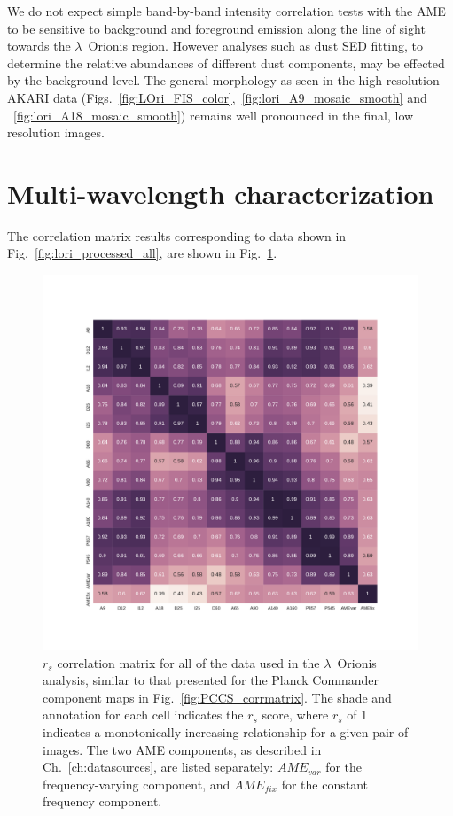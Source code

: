           We do not expect simple band-by-band intensity correlation tests with the AME to be sensitive to background and foreground emission along the line of sight towards the $\lambda$~Orionis region. However analyses such as dust SED fitting, to determine the relative abundances of different dust components, may be effected by the background level. The general morphology as seen in the high resolution AKARI data (Figs.~\ref{fig:LOri_FIS_color},~\ref{fig:lori_A9_mosaic_smooth} and ~\ref{fig:lori_A18_mosaic_smooth}) remains well pronounced in the final, low resolution images.

	\section{Multi-wavelength characterization}
    The correlation matrix results corresponding to data shown in Fig.~\ref{fig:lori_processed_all}, are shown in Fig.~\ref{fig:orionis-corr-matrix}.
      \begin{figure}
        \includegraphics[width=\textwidth]{../Plots/ch_lori/Lori_corrmatrix_I.pdf}
        \centering
        \caption{$r_{s}$ correlation matrix for all of the data used in the $\lambda$~Orionis analysis, similar to that presented for the Planck Commander component maps in Fig.~\ref{fig:PCCS_corrmatrix}. The shade and annotation for each cell indicates the $r_{s}$ score, where $r_{s}$ of 1 indicates a monotonically increasing relationship for a given pair of images. The two AME components, as described in Ch.~\ref{ch:datasources}, are listed separately: $AME_{var}$ for the frequency-varying component, and $AME_{fix}$ for the constant frequency component.}
        \label{fig:orionis-corr-matrix}
      \end{figure}
